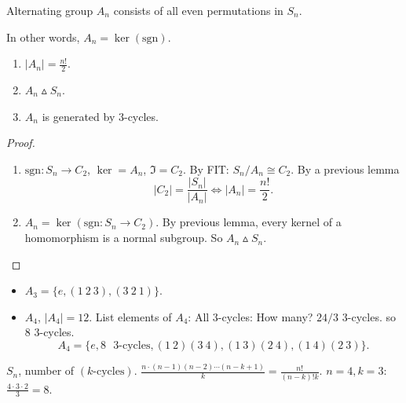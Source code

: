 \documentclass[10pt, a4paper]{article}
\begin{document}
\begin{definition}
    Alternating group $A_n$ consists of all even permutations in $S_n$.

    In other words,
    $A_n = \ker(\mathrm{sgn})$.
\end{definition}

\begin{lemma}\phantom{}
    \begin{enumerate}[label = (\alph*)]
        \item $|A_n| = \frac{n!}{2}$.

        \item $A_n \vartriangle S_n$.

        \item $A_n$ is generated by $3$-cycles.
    \end{enumerate}

    \begin{proof} \phantom{}
        \begin{enumerate}[label = (\alph*)]
            \item $\mathrm{sgn} : S_n \to C_2$,
            $\ker = A_n$,
            $\Im = C_2$.
            By FIT:
            $S_n / A_n \cong C_2$.
            By a previous lemma
            \[
            |C_2| = \frac{|S_n|}{|A_n|} \iff |A_n| = \frac{n!}{2}.
            \]

            \item $A_n = \ker(\mathrm{sgn} : S_n \to C_2)$.
            By previous lemma,
            every kernel of a homomorphism is a normal subgroup.
            So $A_n \vartriangle S_n$.
        \end{enumerate}
    \end{proof}
\end{lemma}

\begin{example}\phantom{}
    \begin{itemize}
        \item $A_3 = \{e, (1\ 2\ 3), (3\ 2\ 1)\}$.

        \item $A_4$,
        $|A_4| = 12$.
        List elements of $A_4$:
        All $3$-cycles:
        How many?
        $24 / 3$ $3$-cycles.
        so $8$ $3$-cycles.
        \[
        A_4 = \{e, \text{$8$ $3$-cycles}, (1\ 2)(3\ 4), (1\ 3)(2\ 4), (1\ 4)(2\ 3)\}.
        \]
    \end{itemize}
\end{example}

\begin{example}
    $S_n$,
    number of $(k\text{-cycles})$.
    $\frac{n \cdot (n - 1)(n - 2)\dotsi(n - k + 1)}{k} = \frac{n!}{(n - k)!k}$.
    $n = 4, k = 3$:
    $\frac{4 \cdot 3 \cdot 2}{3} = 8$.
\end{example}
\end{document}
